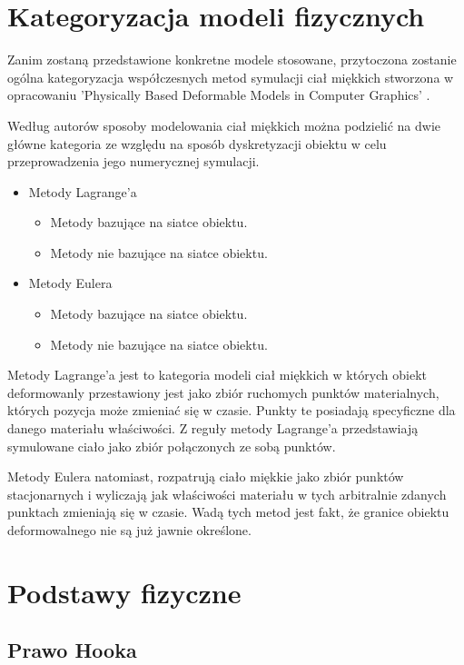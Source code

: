 \section{Kategoryzacja modeli fizycznych}

Zanim zostaną przedstawione konkretne modele stosowane, przytoczona 
zostanie ogólna kategoryzacja współczesnych metod symulacji ciał miękkich
stworzona w opracowaniu 'Physically Based Deformable Models in Computer
Graphics' \cite{pbdo}.

Według autorów sposoby modelowania ciał miękkich można
podzielić na dwie główne kategoria ze względu na sposób dyskretyzacji
obiektu w celu przeprowadzenia jego numerycznej symulacji.
\begin{itemize}
\item Metody Lagrange'a
\begin{itemize}
\item Metody bazujące na siatce obiektu.
\item Metody nie bazujące na siatce obiektu.
\end{itemize}
\item Metody Eulera
\begin{itemize}
\item Metody bazujące na siatce obiektu.
\item Metody nie bazujące na siatce obiektu.
\end{itemize}
\end{itemize}

Metody Lagrange'a jest to kategoria modeli ciał miękkich w których obiekt
deformowanly przestawiony jest jako zbiór ruchomych punktów materialnych,
 których pozycja może zmieniać się w czasie. Punkty te posiadają
 specyficzne dla danego materiału właściwości. Z reguły metody
 Lagrange'a przedstawiają symulowane ciało jako zbiór połączonych ze
 sobą punktów.
 
Metody Eulera natomiast, rozpatrują ciało miękkie jako zbiór punktów
stacjonarnych i wyliczają jak właściwości materiału w tych arbitralnie zdanych
punktach zmieniają się w czasie. Wadą tych metod jest fakt, że granice obiektu
deformowalnego nie są już jawnie określone.\cite{pbdo}

\section{Podstawy fizyczne}
\subsection{Prawo Hooka}
